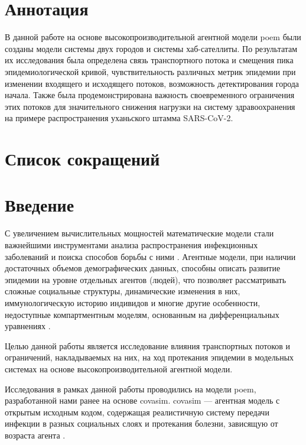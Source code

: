 \documentclass[a4paper,12pt]{article} %
\begin{document}
\section*{Аннотация}
В данной работе на основе высокопроизводительной агентной модели \gls{poem} были созданы модели системы двух городов и системы хаб-сателлиты. По результатам их исследования была определена связь транспортного потока и смещения пика эпидемиологической кривой, чувствительность различных метрик эпидемии при изменении входящего и исходящего потоков, возможность детектирования города начала. Также была продемонстрирована важность своевременного ограничения этих потоков для значительного снижения нагрузки на систему здравоохранения на примере распространения уханьского штамма SARS-CoV-2.

\newpage

\section*{Список сокращений}
\printglossary[type=\acronymtype, title={}]
\newpage

\tableofcontents
\newpage



\section{Введение}
С увеличением вычислительных мощностей математические модели стали важнейшими инструментами анализа распространения инфекционных заболеваний и поиска способов борьбы с ними \cite{hethcote2000mathematics, hethcote1989three, hethcote1992transmission}. Агентные модели, при наличии достаточных объемов демографических данных, способны описать развитие эпидемии на уровне отдельных агентов (людей), что позволяет рассматривать сложные социальные структуры, динамические изменения в них, иммунологическую историю индивидов и многие другие особенности, недоступные компартментным моделям, основанным на дифференциальных уравнениях \cite{rakowski2010influenza}.

Целью данной работы является исследование влияния транспортных потоков и ограничений, накладываемых на них, на ход протекания эпидемии в модельных системах на основе высокопроизводительной агентной модели.

Исследования в рамках данной работы проводились на модели \gls{poem}, разработанной нами ранее на основе \gls{covasim}. \gls{covasim} — агентная модель с открытым исходным кодом, содержащая реалистичную систему передачи инфекции в разных социальных слоях и протекания болезни, зависящую от возраста агента \cite{kerr2021covasim}.
\end{document}
